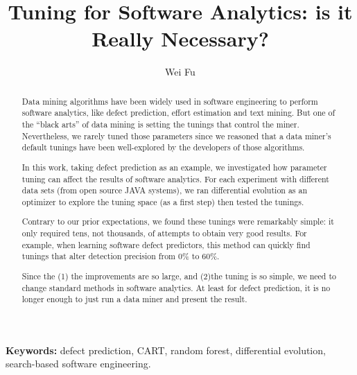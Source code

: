 \documentclass{sig-alternative}
\begin{document}
\title{ Tuning for Software Analytics: is it Really Necessary?}
\author{Wei Fu }
\maketitle
\pagestyle{plain}

\begin{abstract}
Data mining algorithms have been widely used in software engineering to perform software 
analytics, like defect
prediction, effort estimation and text mining. But one of the  ``black arts'' of data mining is setting
the tunings that control the miner. Nevertheless, we rarely tuned those parameters since we
reasoned that a data miner's default tunings have been well-explored by the developers of
those algorithms.

In this work, taking defect prediction as an example, we investigated how parameter tuning can
affect the results of software analytics. For each experiment with different data sets (from open
source JAVA systems), we ran differential evolution as an optimizer to explore the tuning space
(as a first step) then tested the tunings.

Contrary to our prior expectations, we found these tunings were remarkably simple: it only
required tens, not thousands, of attempts to obtain very good results. For example, when
learning software defect predictors, this method can quickly find tunings that alter detection
precision from 0\% to 60\%.

Since the (1) the improvements are so large, and (2)the tuning is so simple, we need to change
standard methods in software analytics. At least for defect prediction, it is no longer enough to
just run a data miner and present the result.

\end{abstract}

\vspace{1mm}
\noindent
{\bf Keywords:} defect prediction, CART, random forest,
differential evolution,
search-based software engineering.
{} %




\end{document}
